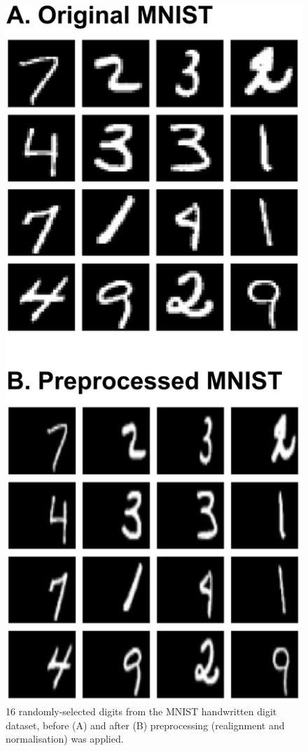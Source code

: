 \documentclass[a4paper,11pt,openany]{book}
\begin{document}
\begin{figure}[htbp]
\centering
\includegraphics[height=0.7\textheight]{./images/methods_mnist.png}
\caption[A subset of MNIST real handwritten digit samples before and after preprocessing]{\label{fig:orgb3d4da0}
16 randomly-selected digits from the MNIST handwritten digit dataset, before (A) and after (B) preprocessing (realignment and normalisation) was applied.}
\end{figure}
\end{document}
